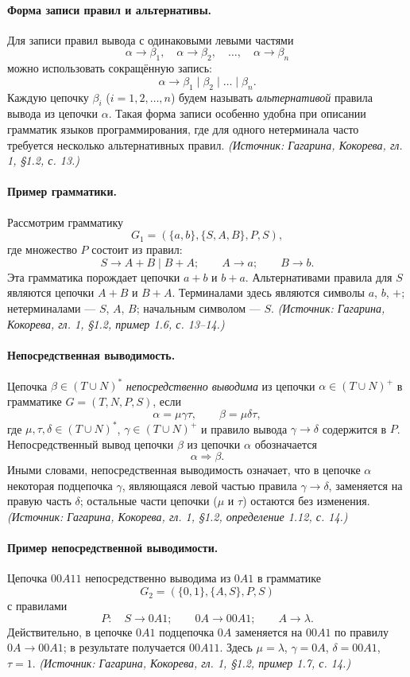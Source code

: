\documentclass[a4paper,12pt]{article}
\begin{document}
\paragraph{Форма записи правил и альтернативы.}
Для записи правил вывода с одинаковыми левыми частями
\[
\alpha\to\beta_1,\quad \alpha\to\beta_2,\quad \ldots,\quad \alpha\to\beta_n
\]
можно использовать сокращённую запись:
\[
\alpha\to\beta_1\mid\beta_2\mid\ldots\mid\beta_n.
\]
Каждую цепочку \(\beta_i\) (\(i=1,2,\ldots,n\)) будем называть \emph{альтернативой} правила вывода из цепочки \(\alpha\). Такая форма записи особенно удобна при описании грамматик языков программирования, где для одного нетерминала часто требуется несколько альтернативных правил.
\textit{(Источник: Гагарина, Кокорева, гл. 1, §1.2, с. 13.)}

\paragraph{Пример грамматики.}
Рассмотрим грамматику
\[
G_1=(\{a,b\},\{S,A,B\},P,S),
\]
где множество \(P\) состоит из правил:
\[
S\to A+B\mid B+A;\qquad A\to a;\qquad B\to b.
\]
Эта грамматика порождает цепочки \(a+b\) и \(b+a\). Альтернативами правила для \(S\) являются цепочки \(A+B\) и \(B+A\). Терминалами здесь являются символы \(a\), \(b\), \(+\); нетерминалами — \(S\), \(A\), \(B\); начальным символом — \(S\).
\textit{(Источник: Гагарина, Кокорева, гл. 1, §1.2, пример 1.6, с. 13--14.)}

\paragraph{Непосредственная выводимость.}
Цепочка \(\beta\in(T\cup N)^*\) \emph{непосредственно выводима} из цепочки \(\alpha\in(T\cup N)^+\) в грамматике \(G=(T,N,P,S)\), если
\[
\alpha=\mu\gamma\tau,\qquad \beta=\mu\delta\tau,
\]
где \(\mu,\tau,\delta\in(T\cup N)^*\), \(\gamma\in(T\cup N)^+\) и правило вывода \(\gamma\to\delta\) содержится в \(P\). Непосредственный вывод цепочки \(\beta\) из цепочки \(\alpha\) обозначается
\[
\alpha\Rightarrow\beta.
\]
Иными словами, непосредственная выводимость означает, что в цепочке \(\alpha\) некоторая подцепочка \(\gamma\), являющаяся левой частью правила \(\gamma\to\delta\), заменяется на правую часть \(\delta\); остальные части цепочки (\(\mu\) и \(\tau\)) остаются без изменения.
\textit{(Источник: Гагарина, Кокорева, гл. 1, §1.2, определение 1.12, с. 14.)}

\paragraph{Пример непосредственной выводимости.}
Цепочка \(00A11\) непосредственно выводима из \(0A1\) в грамматике
\[
G_2=(\{0,1\},\{A,S\},P,S)
\]
с правилами
\[
P:\quad S\to0A1;\qquad 0A\to00A1;\qquad A\to\lambda.
\]
Действительно, в цепочке \(0A1\) подцепочка \(0A\) заменяется на \(00A1\) по правилу \(0A\to00A1\); в результате получается \(00A11\). Здесь \(\mu=\lambda\), \(\gamma=0A\), \(\delta=00A1\), \(\tau=1\).
\textit{(Источник: Гагарина, Кокорева, гл. 1, §1.2, пример 1.7, с. 14.)}
\end{document}
